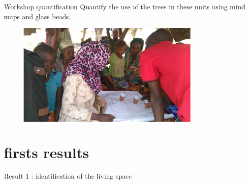 \documentclass[newPxFont]{beamer}
\begin{document}

\begin{frame}[c]{Workshop quantification}
\vspace{-1cm}
Quantify the use of the trees in these units using mind maps and glass beads.

\begin{figure}
  \centering
  \includegraphics[width = 0.8\textwidth]{img/DSC_1793}
\end{figure}

\end{frame}


\section{firsts results}

\begin{frame}[c]{Result 1 : identification of the living space}
\vspace{-1cm}
\begin{figure}
\end{figure}
\end{frame}
\end{document}
